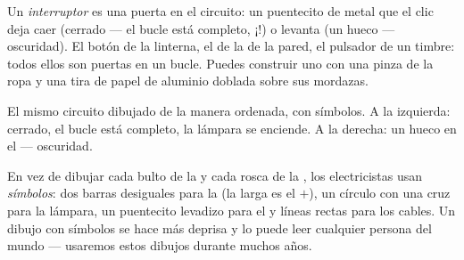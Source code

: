 \begin{example}[El interruptor]\label{ex:g3:first-electric-circuit:switch}
Un \emph{interruptor} es una puerta en el circuito:
un puentecito de metal que el clic deja caer (cerrado --- el bucle
está completo, ¡!) o levanta (un hueco --- oscuridad). El botón
de la linterna, el  de la  de la pared, el pulsador de
un timbre: todos ellos son puertas en un bucle. Puedes construir uno
con una pinza de la ropa y una tira de papel de aluminio doblada sobre
sus mordazas.
\end{example}

\begin{omfigure}

{\small El mismo circuito dibujado de la manera ordenada, con
símbolos. A la izquierda:  cerrado, el bucle está
completo, la lámpara se enciende. A la derecha: un hueco en el
 --- oscuridad.}
\end{omfigure}

\begin{remark}\label{rem:g3:first-electric-circuit:symbols}
En vez de dibujar cada bulto de la  y cada rosca de la
, los electricistas usan \emph{símbolos}: dos barras
desiguales para la  (la larga es el $+$), un círculo con una
cruz para la lámpara, un puentecito levadizo para el  y
líneas rectas para los cables. Un dibujo con símbolos se hace más
deprisa y lo puede leer cualquier persona del mundo --- usaremos estos
dibujos durante muchos años.
\end{remark}

